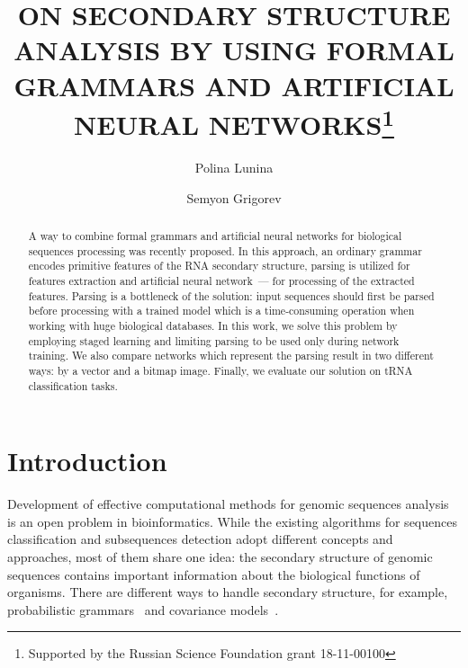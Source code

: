 \documentclass[runningheads]{llncs}
\begin{document}
%
\title{ON SECONDARY STRUCTURE ANALYSIS BY USING FORMAL GRAMMARS AND ARTIFICIAL NEURAL NETWORKS\thanks{Supported by the Russian Science Foundation grant 18-11-00100}}
%
%
\author{Polina Lunina \and
Semyon Grigorev}
%
%
%
\maketitle              %
%
\begin{abstract}
A way to combine formal grammars and artificial neural networks for biological sequences processing was recently proposed.
In this approach, an ordinary grammar encodes primitive features of the RNA secondary structure, parsing is utilized for features extraction and artificial neural network~--- for processing of the extracted features.
Parsing is a bottleneck of the solution: input sequences should first be parsed before processing with a trained model which is a time-consuming operation when working with huge biological databases.
In this work, we solve this problem by employing staged learning and limiting parsing to be used only during network training.
We also compare networks which represent the parsing result in two different ways: by a vector and a bitmap image.
Finally, we evaluate our solution on tRNA classification tasks.

\end{abstract}
%
%
%
\section{Introduction}
Development of effective computational methods for genomic sequences analysis is an open problem in bioinformatics.
While the existing algorithms for sequences classification and subsequences detection adopt different concepts and approaches, most of them share one idea: the secondary structure of genomic sequences contains important information about the biological functions of organisms.
There are different ways to handle secondary structure, for example, probabilistic grammars~\cite{dowell2004evaluation,knudsen1999rna} and covariance models~\cite{EddyDurbin}.
\end{document}
